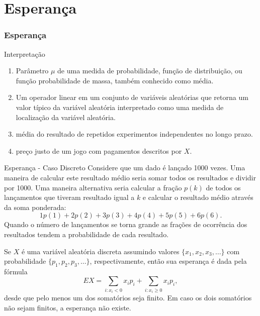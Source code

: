 \section{Esperança}
\begin{frame}
\frametitle{Esperança}
	\begin{block}{Interpretação}
	\begin{enumerate}
		\item Parâmetro $\mu$ de uma medida de probabilidade, função de distribuição, ou função probabilidade de massa, também conhecido como média.
		\item Um operador linear em um conjunto de variáveis aleatórias que
		retorna um valor típico da variável aleatória interpretado como uma
		medida de localização da variável aleatória.
		\item média do resultado de repetidos experimentos independentes no longo prazo.
		\item preço justo de um jogo com pagamentos descritos por $X$.
	\end{enumerate}
\end{block}
\end{frame}

\begin{frame}
\begin{block}{Esperança - Caso Discreto}
Considere que um dado é lançado 1000 vezes. Uma maneira de
calcular este resultado médio seria somar todos os resultados e
dividir por 1000. Uma maneira alternativa seria calcular a fração
$p(k)$ de todos os lançamentos que tiveram resultado igual a $k$ e
calcular o resultado médio através da soma ponderada:
$$1p(1)+2p(2)+3p(3)+4p(4)+5p(5)+6p(6).$$
Quando o número de lançamentos se torna grande as frações de
ocorrência dos resultados tendem a probabilidade de cada resultado.
\end{block}

\begin{defi}
	Se $X$ é uma variável aleatória discreta assumindo valores
	$\{x_1,x_2,x_3,\ldots\}$ com probabilidade $\{p_1,p_2,p_3,\ldots\}$,
	respectivamente, então sua esperança é dada pela fórmula
	$$EX=\sum_{i:x_i<0}x_ip_i+\sum_{i:x_i\geq 0}x_ip_i,$$
	desde que pelo menos um dos somatórios seja finito. Em caso os dois
	somatórios não sejam finitos, a esperança não existe.
\end{defi}
\end{frame}

